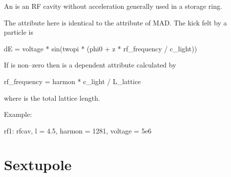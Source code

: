{{An  is an RF cavity without acceleration generally used
in a storage ring.

The  attribute here is identical to the  attribute of
MAD. The kick felt by a particle is 
\begin{example}
  dE = voltage * sin(twopi * (phi0 + z * rf_frequency / c_light))
\end{example}
If  is non--zero then  is a dependent
attribute calculated by
\begin{example}
  rf_frequency = harmon * c_light / L_lattice 
\end{example}
where  is the total lattice length.

Example:
\begin{example}
  rf1: rfcav, l = 4.5, harmon = 1281, voltage = 5e6
\end{example}

\section{Sextupole}
\label{s:sex}

}}
